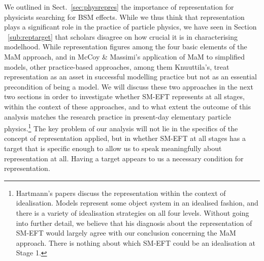 We outlined in Sect.~\ref{sec:physrepres} the importance of representation for physicists searching for BSM effects. 
While we thus think that representation plays a significant role in the practice of particle physics, we have seen in Section ~\ref{sub:reptarget} that scholars disagree on how crucial it is in characterising modelhood. 
While representation figures among the four basic elements of the MaM approach, and in McCoy \& Massimi's application of MaM to simplified models, other practice-based approaches, among them Knuuttila's, treat representation as an asset in successful modelling practice but not as an essential precondition of being a model. 
We will discuss these two approaches in the next two sections in order to investigate whether SM-EFT represents at all stages, within the context of these approaches, and to what extent the outcome of this analysis matches the research practice in present-day elementary particle physics.\footnote{Hartmann's papers discuss the representation within the context of idealisation. Models represent some object system in an idealised fashion, and there is a variety of idealisation strategies on all four levels. Without going into further detail, we believe that his diagnosis about the representation of SM-EFT would largely agree with our conclusion concerning the MaM approach. There is nothing about which SM-EFT could be an idealisation at Stage 1.}
The key problem of our analysis will not lie in the specifics of the concept of representation applied, but in whether SM-EFT at all stages has a target that is specific enough to allow us to speak meaningfully about representation at all. 
Having a target appears to us a necessary condition for representation.


